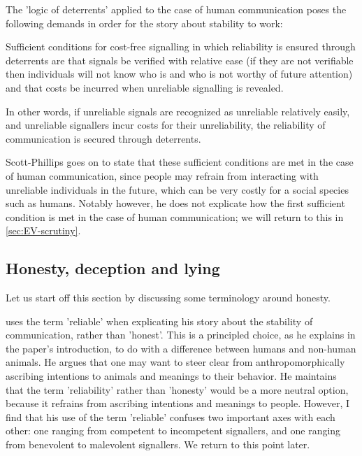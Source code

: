The 'logic of deterrents' applied to the case of human communication poses the following demands in order for the story about stability to work:
\begin{quoting}
    Sufficient conditions for cost-free signalling in which reliability is ensured through deterrents are that signals be verified with relative ease (if they are not verifiable then individuals will not know who is and who is not worthy of future attention) and that costs be incurred when unreliable signalling is revealed.
    \hfill \citep[p.~?]{Scott-Phillips08}
\end{quoting}
In other words, if unreliable signals are recognized as unreliable relatively easily, and unreliable signallers incur costs for their unreliability, the reliability of communication is secured through deterrents.

Scott-Phillips goes on to state that these sufficient conditions are met in the case of human communication, since people may refrain from interacting with unreliable individuals in the future, which can be very costly for a social species such as humans.
Notably however, he does not explicate how the first sufficient condition is met in the case of human communication; we will return to this in \cref{sec:EV-scrutiny}.

\subsection{Honesty, deception and lying}




Let us start off this section by discussing some terminology around honesty.

\citet{Scott-Phillips08} uses the term 'reliable' when explicating his story about the stability of communication, rather than 'honest'. This is a principled choice, as he explains in the paper's introduction, to do with a difference between humans and non-human animals. He argues that one may want to steer clear from anthropomorphically ascribing intentions to animals and meanings to their behavior. He maintains that the term 'reliability' rather than 'honesty' would be a more neutral option, because it refrains from ascribing intentions and meanings to people. 
However, I find that his use of the term 'reliable' confuses two important axes with each other: one ranging from competent to incompetent signallers, and one ranging from benevolent to malevolent signallers. We return to this point later.

